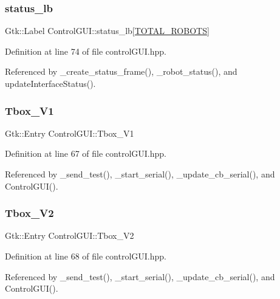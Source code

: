 \subsubsection{\texorpdfstring{status\+\_\+lb}{status\_lb}}
{\footnotesize\ttfamily Gtk\+::\+Label Control\+G\+U\+I\+::status\+\_\+lb\mbox{[}\hyperlink{class_control_g_u_i_a5a2c1a15c09444b56794705721ba73fa}{T\+O\+T\+A\+L\+\_\+\+R\+O\+B\+O\+TS}\mbox{]}}



Definition at line 74 of file control\+G\+U\+I.\+hpp.



Referenced by \+\_\+create\+\_\+status\+\_\+frame(), \+\_\+robot\+\_\+status(), and update\+Interface\+Status().

\mbox{\label{class_control_g_u_i_a8c9b9a41a7ac7de9a7c1c323f70e43b4}} 
\subsubsection{\texorpdfstring{Tbox\+\_\+\+V1}{Tbox\_V1}}
{\footnotesize\ttfamily Gtk\+::\+Entry Control\+G\+U\+I\+::\+Tbox\+\_\+\+V1}



Definition at line 67 of file control\+G\+U\+I.\+hpp.



Referenced by \+\_\+send\+\_\+test(), \+\_\+start\+\_\+serial(), \+\_\+update\+\_\+cb\+\_\+serial(), and Control\+G\+U\+I().

\mbox{\label{class_control_g_u_i_ad4ec00b7d15236b0b8e6723e115c190a}} 
\subsubsection{\texorpdfstring{Tbox\+\_\+\+V2}{Tbox\_V2}}
{\footnotesize\ttfamily Gtk\+::\+Entry Control\+G\+U\+I\+::\+Tbox\+\_\+\+V2}



Definition at line 68 of file control\+G\+U\+I.\+hpp.



Referenced by \+\_\+send\+\_\+test(), \+\_\+start\+\_\+serial(), \+\_\+update\+\_\+cb\+\_\+serial(), and Control\+G\+U\+I().

